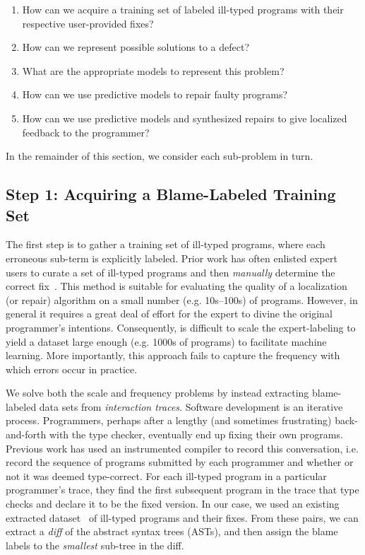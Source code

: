 \begin{enumerate}
  \item How can we acquire a training set of labeled ill-typed programs with
  their respective user-provided fixes?
  \item How can we represent possible solutions to a defect?
  \item What are the appropriate models to represent this problem?
  \item How can we use predictive models to repair faulty programs?
  \item How can we use predictive models and synthesized repairs to give
  localized feedback to the programmer?
\end{enumerate}

In the remainder of this section, we consider each sub-problem in turn.

\subsection{Step 1: Acquiring a Blame-Labeled Training Set}
\label{subsec:step1}

The first step is to gather a training set of ill-typed programs, where each
erroneous sub-term is explicitly labeled. Prior work has often enlisted expert
users to curate a set of ill-typed programs and then \emph{manually} determine
the correct fix~\citep[\eg][]{Lerner2007-dt, Loncaric2016-uk}. This method is
suitable for evaluating the quality of a localization (or repair) algorithm on a
small number (e.g. 10s--100s) of programs. However, in general it requires a
great deal of effort for the expert to divine the original programmer's
intentions. Consequently, is difficult to scale the expert-labeling to yield a
dataset large enough (e.g. 1000s of programs) to facilitate machine learning.
More importantly, this approach fails to capture the frequency with which errors
occur in practice.

 We solve both the scale and frequency problems by
instead extracting blame-labeled data sets from \emph{interaction traces}.
Software development is an iterative process. Programmers, perhaps after a
lengthy (and sometimes frustrating) back-and-forth with the type checker,
eventually end up fixing their own programs. Previous work has used an
instrumented \ocaml compiler to record this conversation, i.e. record the
sequence of programs submitted by each programmer and whether or not it was
deemed type-correct. For each ill-typed program in a particular programmer's
trace, they find the first subsequent program in the trace that type checks and
declare it to be the fixed version. In our case, we used an existing extracted
dataset~\citep[][]{yunounderstand, Seidel:2017} of ill-typed programs and their
fixes. From these pairs, we can extract a \emph{diff} of the abstract syntax
trees (ASTs), and then assign the blame labels to the \emph{smallest} sub-tree
in the diff.


